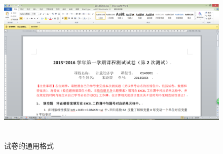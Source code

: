             \begin{figure}[H]
            \centering
            \includegraphics[height=8cm]{images/examination_paper_common_format.jpg}
            \caption{试卷的通用格式}
            \label{fig:试卷的通用格式}
            \end{figure}
